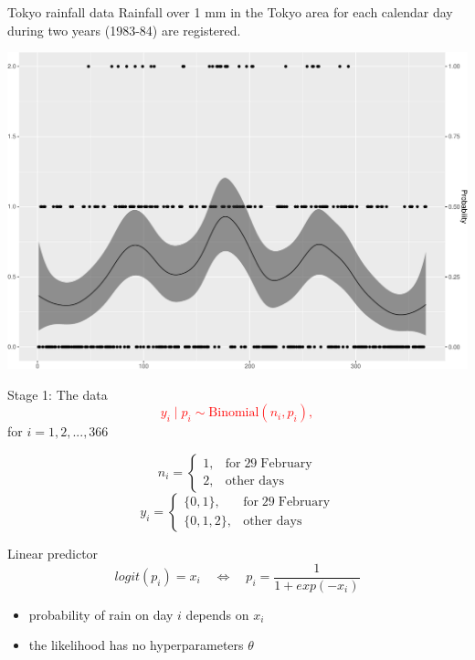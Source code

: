 \documentclass[
  ignorenonframetext,
]{beamer}
\providecommand{\tightlist}{%
  \setlength{\itemsep}{0pt}\setlength{\parskip}{0pt}}
\begin{document}
\begin{frame}{Tokyo rainfall data}
\protect\hypertarget{tokyo-rainfall-data}{}
Rainfall over 1 mm in the Tokyo area for each calendar day during two
years (1983-84) are registered.

\begin{center}\includegraphics[width=0.6\linewidth]{Part1_intro_files/figure-beamer/unnamed-chunk-11-1} \end{center}
\end{frame}

\begin{frame}{Stage 1: The data}
\protect\hypertarget{stage-1-the-data}{}
\textcolor{red}{
$$
y_i\mid p_i \sim \text{Binomial}(n_i, p_i),
$$} for \(i=1,2,...,366\)

\[
n_{i} = \left\{
 \begin{array}{lr}
1, & \text{for}\; 29\; \text{February}\\
2, & \text{other days}
\end{array}\right.
\] \[
y_{i} =
\begin{cases}
\{0,1\}, & \text{for}\; 29\; \text{February}\\
\{0,1,2\}, & \text{other days}
 \end{cases}       
\]

Linear predictor \[
logit(p_i) = x_i \quad \Leftrightarrow \quad p_i = \frac{1}{1+exp(-x_i)}
\]

\begin{itemize}
\tightlist
\item
  probability of rain on day \(i\) depends on \(x_i\)
\item
  the likelihood has no hyperparameters \(\theta\)
\end{itemize}
\end{frame}
\end{document}
